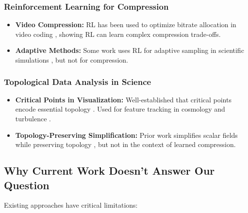 \documentclass[11pt]{article}
\begin{document}
\subsubsection{Reinforcement Learning for Compression}

\begin{itemize}
    \item \textbf{Video Compression:} RL has been used to optimize bitrate allocation in video coding \cite{chen2019deep}, showing RL can learn complex compression trade-offs.

    \item \textbf{Adaptive Methods:} Some work uses RL for adaptive sampling in scientific simulations \cite{ramanah2020optimal}, but not for compression.
\end{itemize}

\subsubsection{Topological Data Analysis in Science}

\begin{itemize}
    \item \textbf{Critical Points in Visualization:} Well-established that critical points encode essential topology \cite{heine2016survey}. Used for feature tracking in cosmology \cite{sousbie2011persistent} and turbulence \cite{kasten2011framework}.

    \item \textbf{Topology-Preserving Simplification:} Prior work simplifies scalar fields while preserving topology \cite{bremer2004topological}, but not in the context of learned compression.
\end{itemize}

\subsection{Why Current Work Doesn't Answer Our Question}

Existing approaches have critical limitations:
\end{document}
